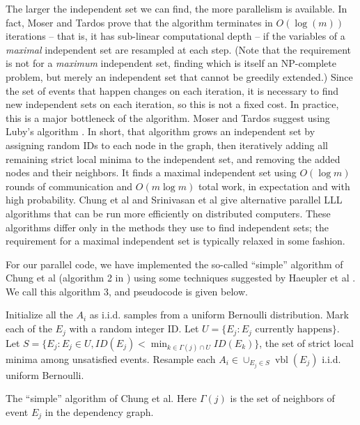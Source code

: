 \documentclass[twocolumn]{article}
\begin{document}
The larger the independent set we can find, the more parallelism is available.  In fact, Moser and Tardos prove that the algorithm terminates in $O(\log(m))$ iterations -- that is, it has sub-linear computational depth -- if the variables of a \emph{maximal} independent set are resampled at each step.  (Note that the requirement is not for a \emph{maximum} independent set, finding which is itself an NP-complete problem, but merely an independent set that cannot be greedily extended.)  Since the set of events that happen changes on each iteration, it is necessary to find new independent sets on each iteration, so this is not a fixed cost.  In practice, this is a major bottleneck of the algorithm.  Moser and Tardos suggest using Luby's algorithm \cite{luby1986simple}.  In short, that algorithm grows an independent set by assigning random IDs to each node in the graph, then iteratively adding all remaining strict local minima to the independent set, and removing the added nodes and their neighbors.  It finds a maximal independent set using $O(\log m)$ rounds of communication and $O(m \log m)$ total work, in expectation and with high probability.  Chung et al \cite{chung2014distributed} and Srinivasan et al \cite{haeupler2011new} give alternative parallel LLL algorithms that can be run more efficiently on distributed computers.  These algorithms differ only in the methods they use to find independent sets; the requirement for a maximal independent set is typically relaxed in some fashion.

For our parallel code, we have implemented the so-called ``simple'' algorithm of Chung et al (algorithm 2 in \cite{chung2014distributed}) using some techniques suggested by Haeupler et al \cite{haeupler2011new}.  We call this algorithm 3, and pseudocode is given below.

\begin{algorithm}[H]
\label{alg:chung-simple}
\begin{algorithmic}
\State Initialize all the $A_i$ as i.i.d. samples from a uniform Bernoulli distribution.
\State Mark each of the $E_j$ with a random integer ID.
  \State Let $U = \{E_j: E_j\text{ currently happens}\}$. 
  \State Let $S = \{E_j: E_j \in U, ID(E_j) < \min_{k \in \Gamma(j) \cap U} ID(E_k)\}$, the set of strict local minima among unsatisfied events.
  \State Resample each $A_i \in \cup_{E_j \in S} \operatorname{vbl}(E_j)$ i.i.d. uniform Bernoulli.
\EndWhile
\end{algorithmic}
\caption{The ``simple'' algorithm of Chung et al.  Here $\Gamma(j)$ is the set of neighbors of event $E_j$ in the dependency graph.}
\end{algorithm}
\end{document}
